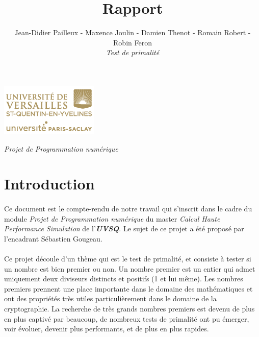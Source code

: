 

\title{\vspace{\fill}\textbf{\Huge Rapport}}
\author{Jean-Didier Pailleux - Maxence Joulin - Damien Thenot - Romain Robert - Robin Feron 
	\vspace{2em}\\
	\textit{Test de primalité}
	\vspace{2em}
}


\clearpage
\maketitle\vspace{13em}
\begin{center}\includegraphics[scale=0.7]{logo.png}\end{center}
\begin{flushright}\textit{Projet de Programmation numérique}\end{flushright}
\newpage
\tableofcontents
\newpage\clearpage{}

	\section{Introduction}
	\paragraph{}Ce document est le compte-rendu de notre travail qui s'inscrit dans le cadre du module \textit{Projet de Programmation numérique} du master \textit{Calcul Haute Performance Simulation} de l'\textit{\textbf{UVSQ}}. Le sujet de ce projet a été proposé par l'encadrant Sébastien Gougeau.
	
	\paragraph{}Ce projet découle d'un thème qui est le test de primalité, et consiste à tester si un nombre est bien premier ou non. Un nombre premier est un entier qui admet uniquement deux diviseurs distincts et positifs (1 et lui même). 
	Les nombres premiers prennent une place importante dans le domaine des mathématiques et ont des propriétés très utiles particulièrement dans le domaine de la cryptographie. La recherche de très grands nombres premiers est devenu de plus en plus captivé par beaucoup, de nombreux tests de primalité ont pu émerger, voir évoluer, devenir plus performants, et de plus en plus rapides.
	
